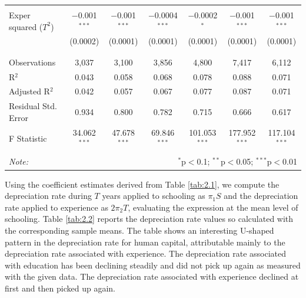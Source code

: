 \documentclass[12pt,a4paper]{article}
\numberwithin{equation}{section}
\begin{document}
\begin{table}[h!]
\begin{tabular}{@{\extracolsep{3pt}}lcccccc}
		& & & & & & \\ 
		Exper squared ($T^2$) & $-$0.001$^{***}$ & $-$0.001$^{***}$ & $-$0.0004$^{***}$ & $-$0.0002$^{*}$ & $-$0.001$^{***}$ & $-$0.001$^{***}$ \\ 
		& (0.0002) & (0.0001) & (0.0001) & (0.0001) & (0.0001) & (0.0001) \\ 
		& & & & & & \\ 
		\hline \\[-1.8ex] 
		Observations & 3,037 & 3,100 & 3,856 & 4,800 & 7,417 & 6,112 \\ 
		R$^{2}$ & 0.043 & 0.058 & 0.068 & 0.078 & 0.088 & 0.071 \\ 
		Adjusted R$^{2}$ & 0.042 & 0.057 & 0.067 & 0.077 & 0.087 & 0.071 \\ 
		Residual Std. Error & 0.934 & 0.800 & 0.782 & 0.715 & 0.666 & 0.617 \\ 
		F Statistic & 34.062$^{***}$ & 47.678$^{***}$ & 69.846$^{***}$ & 101.053$^{***}$ & 177.952$^{***}$ & 117.104$^{***}$ \\ 
		\hline 
		\hline \\[-1.8ex] 
		\textit{Note:}  & \multicolumn{6}{r}{$^{*}$p$<$0.1; $^{**}$p$<$0.05; $^{***}$p$<$0.01} \\ 
	\end{tabular} 
\end{table}


Using the coefficient estimates derived from Table \ref{tab:2.1}, we compute the depreciation rate during $T$ years applied to schooling as $\pi_{1}S $ and the depreciation rate applied to experience as $ 2\pi_{2}T$, evaluating the expression at the mean level of schooling. Table \ref{tab:2.2} reports the depreciation rate values so calculated with the corresponding sample means. The table shows an interesting U-shaped pattern in the depreciation rate for human capital, attributable mainly to the depreciation rate associated with experience. The depreciation rate associated with education has been declining steadily and did not pick up again as measured with the given data. The depreciation rate associated with experience declined at first and then picked up again. 
\end{document}
